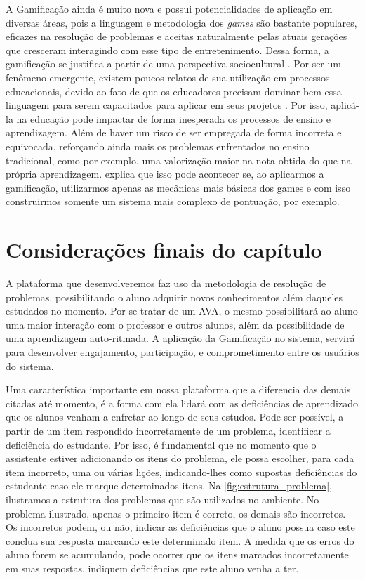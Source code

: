 A Gamificação ainda \'e muito nova e possui potencialidades de aplica\c{c}\~ao em diversas áreas, pois a linguagem e metodologia dos 
\textit{games} s\~ao bastante populares, eficazes na resolução de problemas e aceitas naturalmente pelas atuais gera\c{c}\~oes que 
cresceram interagindo com esse tipo de entretenimento. Dessa forma, a gamificação se justifica a partir de uma perspectiva sociocultural 
\cite{fardo2013gamificaccao}. Por ser um fen\^omeno emergente, existem poucos relatos de sua utiliza\c{c}\~ao em processos educacionais, 
devido ao fato de que os educadores precisam dominar bem essa linguagem para serem capacitados para aplicar em seus projetos 
\cite{fardo2013gamificaccao}. Por isso, aplic\'a-la na educa\c{c}\~ao pode impactar de forma inesperada os processos de ensino e 
aprendizagem. Al\'em de haver um risco de ser empregada de forma incorreta e equivocada, refor\c{c}ando ainda mais os problemas enfrentados 
no ensino tradicional, como por exemplo, uma valoriza\c{c}\~ao maior na nota obtida do que na pr\'opria 
aprendizagem.  explica que isso pode acontecer se, ao aplicarmos a gamifica\c{c}\~ao, utilizarmos
apenas as mecânicas mais básicas dos games e com isso construirmos somente um sistema mais complexo de pontuação, por exemplo.   



\section{Considerações finais do cap\'itulo}

A plataforma que desenvolveremos faz uso da metodologia de resolução de problemas, possibilitando o aluno adquirir novos conhecimentos além daqueles estudados no momento. Por se tratar de um AVA, 
o mesmo possibilitará ao aluno uma maior interação com o professor e outros alunos, além da possibilidade de uma aprendizagem auto-ritmada. A aplicação da Gamificação no sistema, servir\'a para desenvolver  engajamento, participação, e comprometimento entre os usuários do sistema. 

Uma característica importante em nossa plataforma que a diferencia das demais citadas até momento, é a forma com ela lidará com as deficiências de aprendizado que os alunos venham a enfretar ao longo de seus estudos. Pode ser possível, a partir de um item respondido incorretamente de um problema, identificar a deficiência do estudante. Por isso, é fundamental que no momento que o assistente estiver adicionando os itens do problema, ele possa escolher, para cada item incorreto, uma ou várias li\c{c}\~oes, indicando-lhes como supostas defici\^encias do estudante caso ele marque determinados itens. Na \autoref{fig:estrutura_problema}, ilustramos a estrutura dos problemas que são utilizados no ambiente. No problema ilustrado, apenas o primeiro item é correto, os demais são incorretos. Os incorretos podem, ou não, indicar as deficiências que o aluno possua caso este conclua sua resposta marcando este determinado item. A medida que os erros do aluno forem se acumulando, pode ocorrer que os itens marcados incorretamente em suas respostas, indiquem deficiências que este aluno venha a ter.

